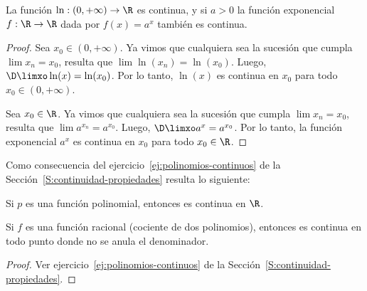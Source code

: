 \begin{proposition}
La función $\ln:(0,+\infty)\to\R$ es continua, y si $a>0$ la función exponencial $f:\R\to\R$ dada por $f(x) = a^x$ también es continua.
\end{proposition}

\begin{proof}
    Sea $x_0 \in (0,+\infty)$. Ya vimos que cualquiera sea la sucesión \sucxn que cumpla $\lim x_n = x_0$, resulta que $\lim \ln(x_n) = \ln(x_0)$.
    Luego, $\D\limxo \ln(x) = \ln(x_0)$. Por lo tanto, $\ln(x)$ es continua en $x_0$ para todo $x_0\in(0,+\infty)$.

    Sea $x_0\in\R$. 
    Ya vimos que cualquiera sea la sucesión \sucxn que cumpla $\lim x_n = x_0$, resulta que $\lim a^{x_n} = a^{x_0}$.
    Luego, $\D\limxo a^x = a^{x_0}$. Por lo tanto, la función exponencial $a^x$ es continua en $x_0$ para todo $x_0\in\R$.
\end{proof}

Como consecuencia del ejercicio~\ref{ej:polinomios-continuos} de la Sección~\ref{S:continuidad-propiedades} resulta lo siguiente:

\begin{proposition}
    Si $p$ es una función polinomial, entonces es continua en $\R$.

    Si $f$ es una función racional (cociente de dos polinomios), entonces es continua en todo punto donde no se anula el denominador.
\end{proposition}

\begin{proof}
    Ver ejercicio~\ref{ej:polinomios-continuos} de la Sección~\ref{S:continuidad-propiedades}.
\end{proof}

